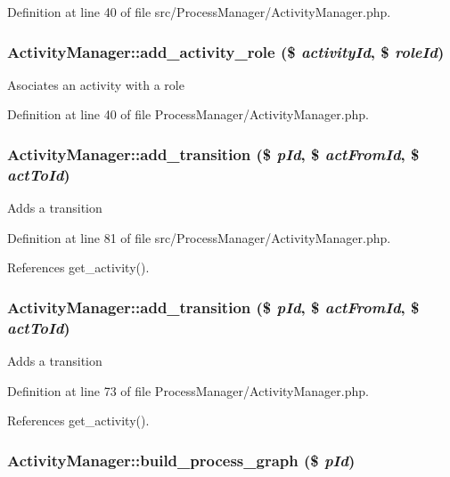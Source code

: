 Definition at line 40 of file src/Process\-Manager/Activity\-Manager.php.
\subsubsection{\setlength{\rightskip}{0pt plus 5cm}Activity\-Manager::add\_\-activity\_\-role (\$ {\em activity\-Id}, \$ {\em role\-Id})}\label{classActivityManager_a2}


Asociates an activity with a role 

Definition at line 40 of file Process\-Manager/Activity\-Manager.php.
\subsubsection{\setlength{\rightskip}{0pt plus 5cm}Activity\-Manager::add\_\-transition (\$ {\em p\-Id}, \$ {\em act\-From\-Id}, \$ {\em act\-To\-Id})}\label{classActivityManager_a22}


Adds a transition 

Definition at line 81 of file src/Process\-Manager/Activity\-Manager.php.

References get\_\-activity().
\subsubsection{\setlength{\rightskip}{0pt plus 5cm}Activity\-Manager::add\_\-transition (\$ {\em p\-Id}, \$ {\em act\-From\-Id}, \$ {\em act\-To\-Id})}\label{classActivityManager_a5}


Adds a transition 

Definition at line 73 of file Process\-Manager/Activity\-Manager.php.

References get\_\-activity().
\subsubsection{\setlength{\rightskip}{0pt plus 5cm}Activity\-Manager::build\_\-process\_\-graph (\$ {\em p\-Id})}\label{classActivityManager_a28}


